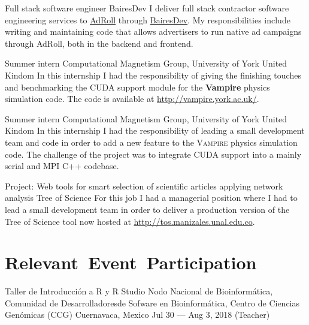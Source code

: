 \documentclass[12pt,english,letter,sans]{moderncv}
\begin{document}
        {Full stack software engineer}
        {BairesDev}
        {}
        {}
        {%
            I deliver full stack contractor software engineering services to
            \href{https://www.adroll.com/}{AdRoll} through
            \href{http://www.bairesdev.com/}{BairesDev}. My responsibilities
            include writing and maintaining code that allows advertisers to run
            native ad campaigns through AdRoll, both in the backend and
            frontend.
        }

        {Summer intern}
        {Computational Magnetism Group, University of York}
        {United Kindom}
        {}
        {%
	    In this internship I had the responsibility of giving the finishing
	    touches and benchmarking the CUDA support module for the
	    \textbf{Vampire} physics simulation code. The code is available at
	    \url{http://vampire.york.ac.uk/}.
        }

        {Summer intern}
        {Computational Magnetism Group, University of York}
        {United Kindom}
        {}
        {%
            In this internship I had the responsibility of leading a small
            development team and code in order to add a new feature to the
            \textsc{Vampire} physics simulation code. The challenge of the
            project was to integrate CUDA support into a mainly serial and MPI
            C++ codebase.
        }

        {Project: Web tools for smart selection of scientific articles applying network analysis}
        {Tree of Science}
        {}
        {}
        {%
            For this job I had a managerial position where I had to lead a
            small development team in order to deliver a production version of
            the Tree of Science tool now hosted at
            \url{http://tos.manizales.unal.edu.co}.
        }


\section{Relevant~Event~Participation}

        {Taller de Introducción a R y R Studio}
        {%
            Nodo Nacional de Bioinformática, Comunidad de Desarrolladoresde
            Sofware en Bioinformática, Centro de Ciencias Genómicas (CCG)
        }
        {Cuernavaca, Mexico}
        {Jul 30 --- Aug 3, 2018}
        {(Teacher)}
\end{document}
